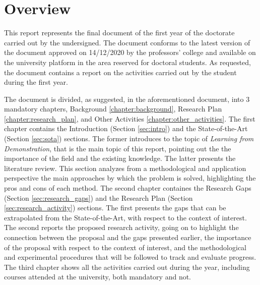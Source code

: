 \clearpage
\chapter*{Overview}\label{chapter:overview}

This report represents the final document of the first year of the doctorate carried out by the undersigned. The document conforms to the latest version of the document \hyperlink{https://corsi.unisa.it/ingegneria-dell-informazione/didattica/guida-dello-studente}{\textit{}} approved on 14/12/2020 by the professors' college and available on the university platform in the area reserved for doctoral students. As requested, the document contains a report on the activities carried out by the student during the first year. \par
The document is divided, as suggested, in the aforementioned document, into 3 mandatory chapters, Background \ref{chapter:background}, Research Plan \ref{chapter:research_plan}, and Other Activities \ref{chapter:other_activities}.
\newline The first chapter contains the Introduction (Section \ref{sec:intro}) and the State-of-the-Art (Section \ref{sec:sota}) sections. The former introduces to the topic of \textit{Learning from Demonstration}, that is the main topic of this report, pointing out the the importance of the field and the existing knowledge. The latter presents the literature review. This section analyzes from a methodological and application perspective the main approaches by which the problem is solved, highlighting the pros and cons of each method.
\newline The second chapter containes the Research Gaps (Section \ref{sec:research_gaps}) and the Research Plan (Section \ref{sec:research_activity}) sections. The first presents the gaps that can be extrapolated from the State-of-the-Art, with respect to the context of interest. The second reports the proposed research activity, going on to highlight the connection between the proposal and the gaps presented earlier, the importance of the proposal with respect to the context of interest, and the methodological and experimental procedures that will be followed to track and evaluate progress.
\newline The third chapter shows all the activities carried out during the year, including courses attended at the university, both mandatory and not.

